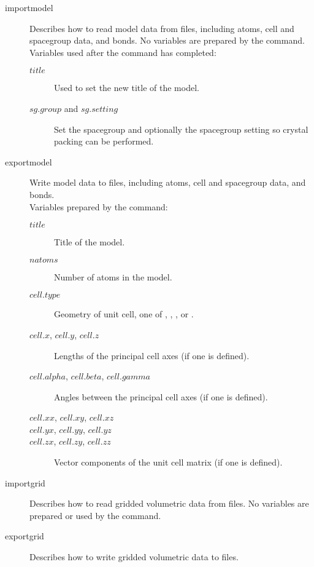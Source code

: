 \begin{description}

	\item[importmodel\its]
	Describes how to read model data from files, including atoms, cell and spacegroup data, and bonds.
	No variables are prepared by the command. Variables used after the command has completed:
	\begin{description}
		\item[$title$\its]
			Used to set the new title of the model.
		\item[$sg.group$ and $sg.setting$\its]
			Set the spacegroup and optionally the spacegroup setting so crystal packing can be performed.
	\end{description}

	\item[exportmodel\its]
	Write model data to files, including atoms, cell and spacegroup data, and bonds.\\
	Variables prepared by the command:
	\begin{description}
		\item[$title$\its]
			Title of the model.
		\item[$natoms$\its]
			Number of atoms in the model.
		\item[$cell.type$\its]
			Geometry of unit cell, one of , , , or .
		\item[$cell.x$, $cell.y$, $cell.z$\its]
			Lengths of the principal cell axes (if one is defined).
		\item[$cell.alpha$, $cell.beta$, $cell.gamma$\its]
			Angles between the principal cell axes (if one is defined).
		\item[$cell.xx$, $cell.xy$, $cell.xz$]
		\item[$cell.yx$, $cell.yy$, $cell.yz$]
		\item[$cell.zx$, $cell.zy$, $cell.zz$\its]
			Vector components of the unit cell matrix (if one is defined).
	\end{description}

	\item[importgrid\its]
	Describes how to read gridded volumetric data from files. No variables are prepared or used by the command.

	\item[exportgrid\its]
	Describes how to write gridded volumetric data to files.


\end{description}
